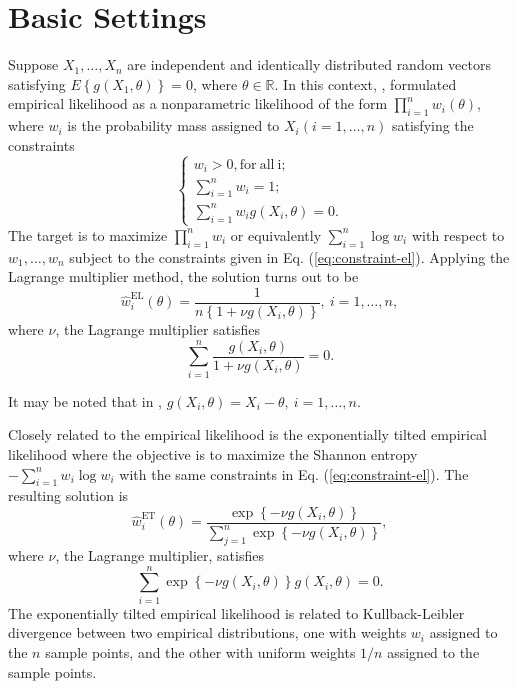 \documentclass[oneside,english]{amsbook}
\numberwithin{section}{chapter}
\numberwithin{equation}{section}
\numberwithin{figure}{section}
\theoremstyle{plain}
\theoremstyle{plain}
\theoremstyle{definition}
\theoremstyle{plain}
\theoremstyle{plain}
\theoremstyle{remark}
\theoremstyle{definition}
\theoremstyle{definition}
\begin{document}
\section{Basic Settings }

Suppose $X_{1},\ldots,X_{n}$ are independent and identically distributed
random  vectors satisfying $E\left\{ g\left(X_{1},\theta\right)\right\} =0$,
where $\theta\in\mathbb{R}$. In this context, \cite{owen1988empirical},
formulated empirical likelihood as a nonparametric likelihood of the
form $\prod_{i=1}^{n}w_{i}\left(\theta\right)$, where $w_{i}$ is
the probability mass assigned to $X_{i}\left(i=1,\ldots,n\right)$
satisfying the constraints 
\begin{equation}
\begin{cases}
w_{i}>0,\mathrm{for\: all\: i;}\\
\sum_{i=1}^{n}w_{i}=1;\\
\sum_{i=1}^{n}w_{i}g\left(X_{i},\theta\right)=0.
\end{cases}\label{eq:constraint-el}
\end{equation}
The target is to maximize $\prod_{i=1}^{n}w_{i}$ or equivalently
$\sum_{i=1}^{n}\log w_{i}$ with respect to $w_{1},\ldots,w_{n}$
subject to the constraints given in Eq. (\ref{eq:constraint-el}). Applying
the Lagrange multiplier method, the solution turns out to be 
\begin{equation}
\hat{w}_{i}^{\mathrm{EL}}\left(\theta\right)=\frac{1}{n\left\{ 1+\nu g\left(X_{i},\theta\right)\right\} },\: i=1,\ldots,n,\label{eq:sol-emp-lik}
\end{equation}
where $\nu$, the Lagrange multiplier satisfies 
\begin{equation}
\sum_{i=1}^{n}\frac{g\left(X_{i},\theta\right)}{1+\nu g\left(X_{i},\theta\right)}=0.\label{eq:lambda-eq}
\end{equation}


It may be noted that in  \cite{fang2005expected,fang2006empirical}%
{}, $g\left(X_{i},\theta\right)=X_{i}-\theta,\:i=1,\ldots,n$. 

Closely related to the empirical likelihood is the exponentially tilted
empirical likelihood where the objective is to maximize the Shannon
entropy $-\sum_{i=1}^{n}w_{i}\log w_{i}$ with the same constraints
in Eq. (\ref{eq:constraint-el}). The resulting solution is 
\[
\hat{w}_{i}^{\mathrm{ET}}\left(\theta\right)=\frac{\exp\left\{ -\nu g\left(X_{i},\theta\right)\right\} }{\sum_{j=1}^{n}\exp\left\{ -\nu g\left(X_{i},\theta\right)\right\} },
\]
where $\nu$, the Lagrange multiplier, satisfies 
\begin{equation}
\sum_{i=1}^{n}\exp\left\{ -\nu g\left(X_{i},\theta\right)\right\} g\left(X_{i},\theta\right)=0.\label{eq:lag-mul-exp-tilt-el}
\end{equation}
The exponentially tilted empirical likelihood is related to Kullback-Leibler
divergence between two empirical distributions, one with weights $w_{i}$
assigned to the $n$ sample points, and the other with uniform weights
$1/n$ assigned to the sample points. 
\end{document}
